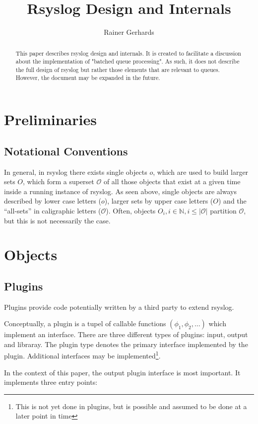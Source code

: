 \documentclass[a4paper,10pt]{article}
\title{Rsyslog Design and Internals}
\author{Rainer Gerhards}
\newcommand{\IN}{\mathbb{N}}
\begin{document}
\maketitle

\begin{abstract}
This paper describes rsyslog design and internals. It is created to facilitate a discussion about the implementation of "batched queue processing". As such, it does not describe the full design of rsyslog but rather those elements that are relevant to queues. However, the document may be expanded in the future.
\end{abstract}

\tableofcontents

\section{Preliminaries}
\subsection{Notational Conventions}
In general, in rsyslog there exists single objects $o$, which are used to build larger sets $O$, which form a superset $\mathcal{O}$ of all those objects that exist at a given time inside a running instance of rsyslog. As seen above, single objects are always described by lower case letters ($o$), larger sets by upper case letters ($O$) and the ``all-sets'' in caligraphic letters ($\mathcal{O}$). Often, objects $O_i, i \in \IN, i \le |\mathcal{O}|$ partition $\mathcal{O}$, but this is not necessarily the case.
\section{Objects}

\subsection{Plugins}
Plugins provide code potentially written by a third party to extend rsyslog.

Conceptually, a plugin is a tupel of callable functions $(\phi_1, \phi_2, \ldots)$ which implement an interface. There are three different types of plugins: input, output and libraray. The plugin type denotes the primary interface implemented by the plugin. Additional interfaces may be implemented\footnote{This is not yet done in plugins, but is possible and assumed to be done at a later point in time}.

In the context of this paper, the output plugin interface is most important. It implements three entry points:
\end{document}

